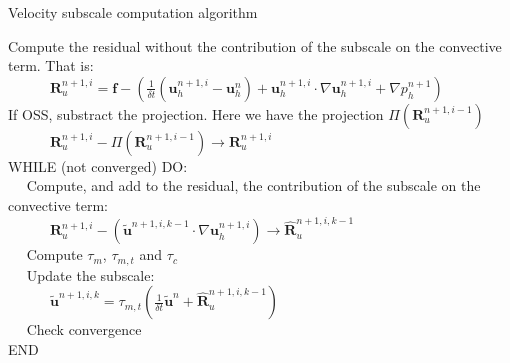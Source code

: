 \begin{algorithm}
\caption{Velocity subscale computation algorithm}
\label{alg-A2_sgs_algorithm}
Compute the residual without the contribution of the subscale on the convective term. That is:\\
$\quad\quad\quad\mathbf{R}_u^{n+1,i}=\mathbf{f}-\left(\frac{1}{\delta t}(\mathbf{u}_h^{n+1,i}-\mathbf{u}_h^{n})+\mathbf{u}_h^{n+1,i}\cdot\nabla\mathbf{u}_h^{n+1,i}+\nabla p_h^{n+1}\right)$\\
If OSS, substract the projection. Here we have the projection $\Pi(\mathbf{R}_u^{n+1,i-1})$ \\
$\quad\quad\quad\mathbf{R}_u^{n+1,i}-\Pi(\mathbf{R}_u^{n+1,i-1})\rightarrow\mathbf{R}_u^{n+1,i}$\\
WHILE (not converged) DO:\\
$\quad$ Compute, and add to the residual, the contribution of the subscale on the convective term:\\ $\quad\quad\quad\mathbf{R}_u^{n+1,i}-(\tilde{\mathbf{u}}^{n+1,i,k-1}\cdot\nabla\mathbf{u}_h^{n+1,i})\rightarrow\hat{\mathbf{R}}_u^{n+1,i,k-1}$\\
$\quad$ Compute $ \tau_m $, $ \tau_{m,t} $ and $ \tau_c $\\
$\quad$ Update the subscale:\\
$\quad\quad\quad\tilde{\mathbf{u}}^{n+1,i,k}=\tau_{m,t}\left(\frac{1}{\delta t}\tilde{\mathbf{u}}^{n}+\hat{\mathbf{R}}_u^{n+1,i,k-1}\right)$\\
$\quad$ Check convergence\\
END
\end{algorithm}